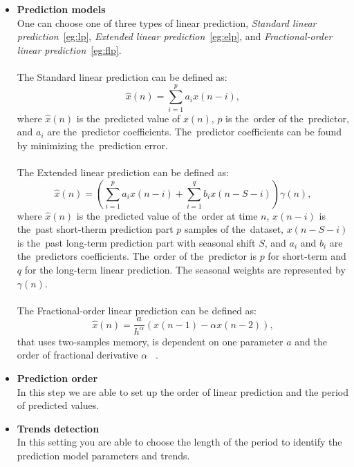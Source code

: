         \begin{itemize}
            \item \textbf{Prediction models}\\
            One can choose one of three types of linear prediction, \emph{Standard linear prediction}~\ref{eg:lp}, \emph{Extended linear prediction}~\ref{eg:elp},
            and \emph{Fractional-order linear prediction}~\ref{eg:flp}.\\
      \\
     The Standard linear prediction can be defined as:
                 \begin{equation}\label{eg:lp}
                \hat{x}(n) = \sum_{i=1}^{p} a_i x(n-i),
                \label{eq:linear-predictor}
            \end{equation}
            where $\hat{x}(n)$ is the~predicted value of $x(n)$, $p$ is the~order of the~predictor, and $a_i$ are the~predictor coefficients. The~predictor coefficients can be found by minimizing the~prediction error.
                        \\
                        \\
    The Extended linear prediction can be defined as:
%
                 \begin{equation}\label{eg:elp}
                \hat{x}(n) = \left(\sum_{i=1}^{p} a_i x(n-i) + \sum_{i=1}^{q} b_i x(n-S-i)\right) \gamma(n),
            \end{equation}
            where $\hat{x}(n)$ is the~predicted value of the~order at time $n$, $x(n-i)$ is the~past short-therm prediction part $p$ samples of the~dataset, $x(n-S-i)$ is the~past long-term prediction part with seasonal shift $S$, and $a_i$ and $b_i$ are the~predictors coefficients. The~order of the~predictor is $p$ for short-term and $q$ for the long-term linear prediction. The seasonal weights are represented by $\gamma(n)$.\\
                                    \\
    The Fractional-order linear prediction can be defined as:
            \\
            \begin{equation}\label{eg:flp}
                \hat{x}(n) = \frac{a}{h^\alpha}(x(n-1) - \alpha x(n-2)),
                \label{eq:linear-predictor}
            \end{equation}
            that uses two-samples memory, is dependent on one parameter $a$ and the order of fractional derivative $\alpha$~\cite{skovranek}
.
           
            \item \textbf{Prediction order}\\
            In this step we are able to set up the order of linear prediction and the
            period of predicted values.
            \item \textbf{Trends detection}\\
            In this setting you are able to choose the length of the period to 
            identify the prediction model parameters and trends.
        \end{itemize}
